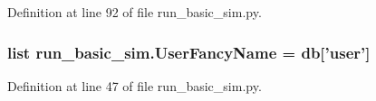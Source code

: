 Definition at line 92 of file run\-\_\-basic\-\_\-sim.\-py.

\hypertarget{namespacerun__basic__sim_a60114f9226c72a5363daf6abd4e68f3f}{
\subsubsection[{User\-Fancy\-Name}]{\setlength{\rightskip}{0pt plus 5cm}list run\-\_\-basic\-\_\-sim.\-User\-Fancy\-Name = {\bf db}\mbox{[}'user'\mbox{]}}}\label{namespacerun__basic__sim_a60114f9226c72a5363daf6abd4e68f3f}


Definition at line 47 of file run\-\_\-basic\-\_\-sim.\-py.

